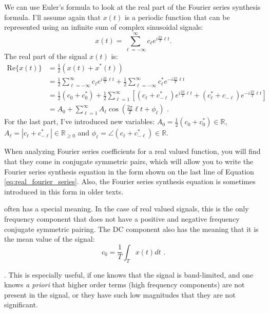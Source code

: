  We can use Euler's formula to look at the real part of the Fourier series synthesis formula. I'll assume again that $x(t)$ is a periodic function that can be represented using an infinite sum of complex sinusoidal signals:
\begin{equation}
x(t) = \sum_{\ell = -\infty}^{\infty} c_{\ell} e^{i\frac{2\pi}{T}\ell t}.
\end{equation}
The real part of the signal $x(t)$ is:
\begin{align}
\mathrm{Re}\{x(t)\} &= \frac{1}{2} (x(t) + x^*(t)) \\
&= \frac{1}{2}\sum_{\ell=-\infty}^{\infty} c_{\ell} e^{i\frac{2\pi}{T}\ell t} + \frac{1}{2}\sum_{\ell=-\infty}^{\infty} c^*_{\ell} e^{-i\frac{2\pi}{T}\ell t} \\
&= \frac{1}{2}(c_0 + c_0^*) + \frac{1}{2}\sum_{\ell=1}^{\infty}[ (c_{\ell} + c^*_{-\ell}) e^{i\frac{2\pi}{T}\ell t} + (c^*_{\ell} + c_{-\ell}) e^{-i\frac{2\pi}{T}\ell t}]\\
&= A_0 + \sum_{\ell=1}^{\infty} A_\ell \cos\left(\frac{2\pi}{T}\ell t+\phi_\ell\right) \,\,.
\label{eq:real_fourier_series}
\end{align}
For the last part, I've introduced new variables: $A_0= \frac{1}{2}(c_0 + c_0^*) \in \mathbb{R}$, $A_\ell = |c_{\ell} +c^*_{-\ell}|\in \mathbb{R}_{\ge 0}$ and $\phi_\ell = \angle (c_{\ell} + c^*_{-\ell}) \in \mathbb{R}$. 

When analyzing Fourier series coefficients for a real valued function, you will find that they come in conjugate symmetric pairs, 
which will allow you to write the Fourier series synthesis equation in the form shown on the last line of Equation \ref{eq:real_fourier_series}. 
Also, the Fourier series synthesis equation is sometimes introduced in this form in older texts.

 often has a special meaning. In the case of real valued signals, 
this is the only frequency component that does not have a positive and negative frequency conjugate symmetric pairing. The DC component also has the meaning that it is the mean value of the signal:
\begin{equation}
c_0 = \frac{1}{T} \int_{T} x(t) dt \,\,.
\end{equation}

. This is especially useful, if one knows that the signal is band-limited, 
and one knows \emph{a priori} that higher order terms (high frequency components) are not present in the signal, or they have such low magnitudes that they are not significant. 


